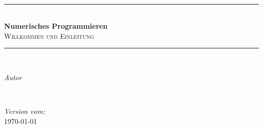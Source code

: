 
\begin{titlepage} %
	\newcommand{\HRule}{\rule{\linewidth}{0.5mm}} %
	
	\center %
	
	
	
	\hspace{1cm} \\[3.5cm]
	
	
	\HRule\\[0.4cm]
	
	{\huge\bfseries Numerisches Programmieren}\\[0.4cm] %
	
	\textsc{\Large Willkommen und Einleitung}\\[0.5cm] %
	
	\HRule\\[1.5cm]
	
	
	\begin{minipage}{0.4\textwidth}
		\begin{flushleft}
			\large
			\textit{Autor}\\
			\textsc{\npauthor{}} %
		\end{flushleft}
	\end{minipage}
	~
	\begin{minipage}{0.4\textwidth}
		\begin{flushright}
			\large
			\textit{Version vom:}\\
			\textsc{\today} %
		\end{flushright}
	\end{minipage}
	
	

\end{titlepage}
